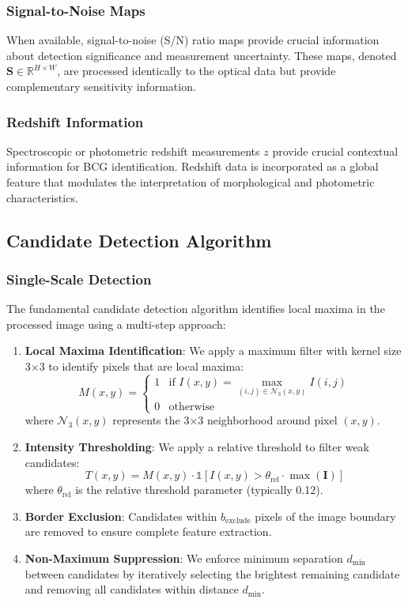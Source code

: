 \documentclass[twocolumn,10pt]{aastex631}
\begin{document}
\subsubsection{Signal-to-Noise Maps}
When available, signal-to-noise (S/N) ratio maps provide crucial information about detection significance and measurement uncertainty. These maps, denoted $\mathbf{S} \in \mathbb{R}^{H \times W}$, are processed identically to the optical data but provide complementary sensitivity information.

\subsubsection{Redshift Information}
Spectroscopic or photometric redshift measurements $z$ provide crucial contextual information for BCG identification. Redshift data is incorporated as a global feature that modulates the interpretation of morphological and photometric characteristics.

\subsection{Candidate Detection Algorithm}

\subsubsection{Single-Scale Detection}
The fundamental candidate detection algorithm identifies local maxima in the processed image using a multi-step approach:

\begin{enumerate}
\item \textbf{Local Maxima Identification}: We apply a maximum filter with kernel size 3×3 to identify pixels that are local maxima:
\begin{equation}
M(x,y) = \begin{cases} 
1 & \text{if } I(x,y) = \max_{(i,j) \in \mathcal{N}_{3}(x,y)} I(i,j) \\
0 & \text{otherwise}
\end{cases}
\end{equation}
where $\mathcal{N}_{3}(x,y)$ represents the 3×3 neighborhood around pixel $(x,y)$.

\item \textbf{Intensity Thresholding}: We apply a relative threshold to filter weak candidates:
\begin{equation}
T(x,y) = M(x,y) \cdot \mathbb{1}[I(x,y) > \theta_{\text{rel}} \cdot \max(\mathbf{I})]
\end{equation}
where $\theta_{\text{rel}}$ is the relative threshold parameter (typically 0.12).

\item \textbf{Border Exclusion}: Candidates within $b_{\text{exclude}}$ pixels of the image boundary are removed to ensure complete feature extraction.

\item \textbf{Non-Maximum Suppression}: We enforce minimum separation $d_{\min}$ between candidates by iteratively selecting the brightest remaining candidate and removing all candidates within distance $d_{\min}$.
\end{enumerate}
\end{document}
